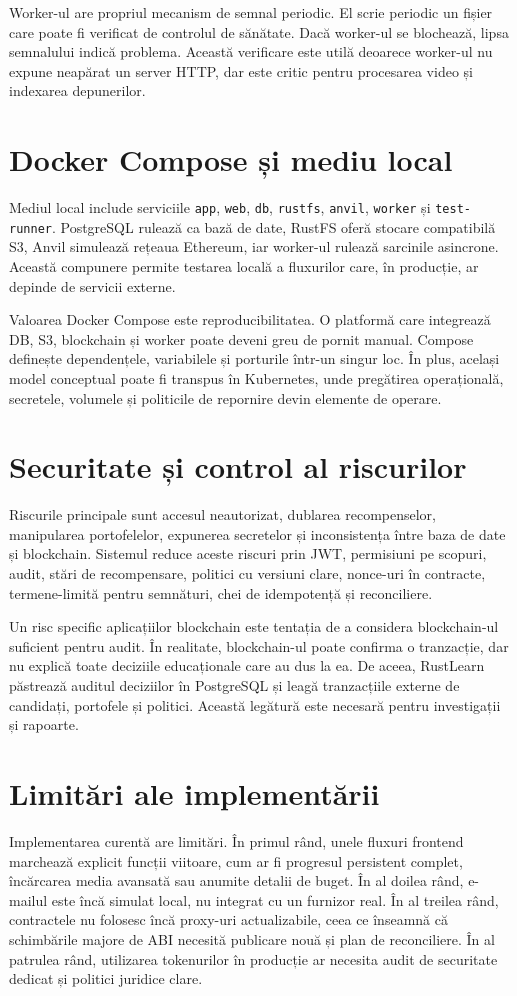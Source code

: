 Worker-ul are propriul mecanism de semnal periodic. El scrie periodic un fișier care poate fi verificat de controlul de sănătate. Dacă worker-ul se blochează, lipsa semnalului indică problema. Această verificare este utilă deoarece worker-ul nu expune neapărat un server HTTP, dar este critic pentru procesarea video și indexarea depunerilor.

\section{Docker Compose și mediu local}
Mediul local include serviciile \texttt{app}, \texttt{web}, \texttt{db}, \texttt{rustfs}, \texttt{anvil}, \texttt{worker} și \texttt{test-runner}. PostgreSQL rulează ca bază de date, RustFS oferă stocare compatibilă S3, Anvil simulează rețeaua Ethereum, iar worker-ul rulează sarcinile asincrone. Această compunere permite testarea locală a fluxurilor care, în producție, ar depinde de servicii externe.

Valoarea Docker Compose este reproducibilitatea. O platformă care integrează DB, S3, blockchain și worker poate deveni greu de pornit manual. Compose definește dependențele, variabilele și porturile într-un singur loc. În plus, același model conceptual poate fi transpus în Kubernetes, unde pregătirea operațională, secretele, volumele și politicile de repornire devin elemente de operare.

\section{Securitate și control al riscurilor}
Riscurile principale sunt accesul neautorizat, dublarea recompenselor, manipularea portofelelor, expunerea secretelor și inconsistența între baza de date și blockchain. Sistemul reduce aceste riscuri prin JWT, permisiuni pe scopuri, audit, stări de recompensare, politici cu versiuni clare, nonce-uri în contracte, termene-limită pentru semnături, chei de idempotență și reconciliere.

Un risc specific aplicațiilor blockchain este tentația de a considera blockchain-ul suficient pentru audit. În realitate, blockchain-ul poate confirma o tranzacție, dar nu explică toate deciziile educaționale care au dus la ea. De aceea, RustLearn păstrează auditul deciziilor în PostgreSQL și leagă tranzacțiile externe de candidați, portofele și politici. Această legătură este necesară pentru investigații și rapoarte.

\section{Limitări ale implementării}
Implementarea curentă are limitări. În primul rând, unele fluxuri frontend marchează explicit funcții viitoare, cum ar fi progresul persistent complet, încărcarea media avansată sau anumite detalii de buget. În al doilea rând, e-mailul este încă simulat local, nu integrat cu un furnizor real. În al treilea rând, contractele nu folosesc încă proxy-uri actualizabile, ceea ce înseamnă că schimbările majore de ABI necesită publicare nouă și plan de reconciliere. În al patrulea rând, utilizarea tokenurilor în producție ar necesita audit de securitate dedicat și politici juridice clare.


